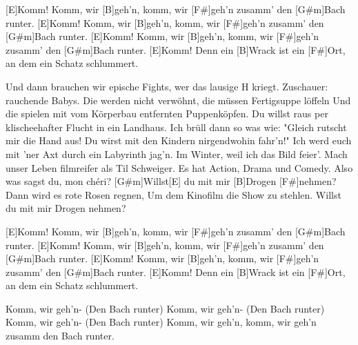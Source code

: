 \begin{guitar}
	\begin{highlightbar}
		[E]Komm! Komm, wir [B]geh'n, komm, wir [F#]geh'n zusamm' den [G#m]Bach runter.
		[E]Komm! Komm, wir [B]geh'n, komm, wir [F#]geh'n zusamm' den [G#m]Bach runter.
		[E]Komm! Komm, wir [B]geh'n, komm, wir [F#]geh'n zusamm' den [G#m]Bach runter.
		[E]Komm! Denn ein [B]Wrack ist ein [F#]Ort, an dem ein Schatz schlummert.
	\end{highlightbar}
	
	\songsection{Strophe 3}
	Und dann brauchen wir epische Fights, wer das lausige H kriegt.
	Zuschauer: rauchende Babys.
	Die werden nicht verwöhnt, die müssen Fertigsuppe löffeln
	Und die spielen mit vom Körperbau entfernten Puppenköpfen.
	Du willst raus per klischeehafter Flucht in ein Landhaus.
	Ich brüll dann so was wie: "Gleich rutscht mir die Hand aus!
	Du wirst mit den Kindern nirgendwohin fahr'n!"
	Ich werd euch mit 'ner Axt durch ein Labyrinth jag’n.
	Im Winter, weil ich das Bild feier'.
	Mach unser Leben filmreifer als Til Schweiger.
	Es hat Action, Drama und Comedy.
	Also was sagst du, mon chéri?
	\pagebreak
	\songsection{Bridge}
	[G#m]Willst[E] du mit mir [B]Drogen [F#]nehmen?
	Dann wird es rote Rosen regnen,
	Um dem Kinofilm die Show zu stehlen.
	Willst du mit mir Drogen nehmen?
	
	\begin{highlightbar}
		\songsection{Refrain}
		[E]Komm! Komm, wir [B]geh'n, komm, wir [F#]geh'n zusamm' den [G#m]Bach runter.
		[E]Komm! Komm, wir [B]geh'n, komm, wir [F#]geh'n zusamm' den [G#m]Bach runter.
		[E]Komm! Komm, wir [B]geh'n, komm, wir [F#]geh'n zusamm' den [G#m]Bach runter.
		[E]Komm! Denn ein [B]Wrack ist ein [F#]Ort, an dem ein Schatz schlummert.
	\end{highlightbar}
	
	Komm, wir geh'n- (Den Bach runter)
	Komm, wir geh'n- (Den Bach runter)
	Komm, wir geh'n- (Den Bach runter)
	Komm, wir geh'n, komm, wir geh'n zusamm den Bach runter.
\end{guitar}

